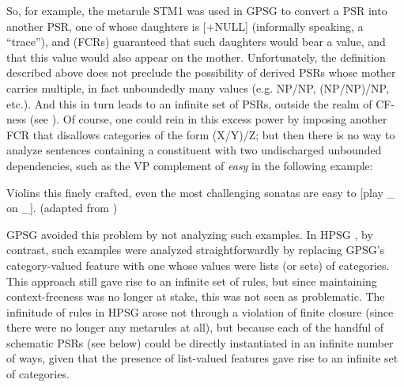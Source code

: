 \documentclass[output=paper
 	        ,biblatex
                ,babelshorthands
                ,newtxmath
                ,draftmode
                ,colorlinks, citecolor=brown
]{langscibook}
\begin{document}
So, for example, the metarule STM1 was used in GPSG to convert a PSR into another PSR, one of whose daughters is [+NULL] (informally speaking, a ``trace''), and  (FCRs) guaranteed that such daughters would bear a \slasch value, and that this \slasch value would also appear on the mother. Unfortunately, the  definition described above does not preclude the possibility of derived PSRs whose mother carries multiple, in fact unboundedly many
\slasch values (e.g. NP/NP, (NP/NP)/NP, etc.). And this in turn leads to an infinite set of PSRs, outside the realm of CF-ness (see \citealt{Ristad86}).  Of course, one could rein in this excess power by imposing another FCR that disallows categories of the form (X/Y)/Z; but then there is no way to analyze sentences containing a constituent with two undischarged unbounded dependencies, such as the VP complement of \emph{easy} in the following example:

\ea
\label{ex-violins}
Violins this finely crafted, even the most challenging sonatas are easy to [play \_ on \_]. (adapted from \citealt[]{ps2})
\z

\noindent
GPSG avoided this problem by not analyzing such examples. In HPSG \citep{Pollard85a-u}, by contrast, such examples were analyzed straightforwardly by replacing GPSG's category-valued \slasch feature with one whose values were lists (or sets) of categories. This approach still gave rise to an infinite set of rules, but since maintaining context-freeness was no longer at stake, this was not seen as problematic. The infinitude of rules in HPSG arose not through a violation of finite closure (since there were no longer any metarules at all), but because each of the handful of schematic PSRs (see below) could be directly instantiated in an infinite number of ways, given that the presence of list-valued
features gave rise to an infinite set of categories.
\end{document}
